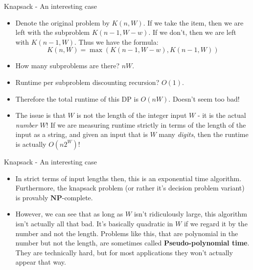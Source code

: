 \documentclass{beamer}
\begin{document}
\begin{frame}{Knapsack - An interesting case}
    \begin{itemize}
        \item Denote the original problem by $K(n,W)$. If we take the item, then we are left with the subproblem $K(n-1,W-w)$. If we don't, then we are left with $K(n-1,W)$. Thus we have the formula:
        \[ K(n,W) = \max\left(K(n-1,W-w), K(n-1,W)\right) \]
        \item How many subproblems are there? \pause $nW$. \pause 
        \item Runtime per subproblem discounting recursion? \pause $O(1)$. 
        \item Therefore the total runtime of this DP is $O(nW)$. Doesn't seem too bad! 
        \item The issue is that $W$ is not the length of the integer input $W$ - it is the actual \emph{number} $W$! If we are measuring runtime strictly in terms of the length of the input as a string, and given an input that is $W$ many \emph{digits}, then the runtime is actually $O(n2^W)$! 
    \end{itemize}
\end{frame}

\begin{frame}{Knapsack - An interesting case}
    \begin{itemize}
        \item In strict terms of input lengths then, this is an exponential time algorithm. Furthermore, the knapsack problem (or rather it's decision problem variant) is provably $\mathbf{NP}$-complete. \pause 
        \item However, we can see that as long as $W$ isn't ridiculously large, this algorithm isn't actually all that bad. It's basically quadratic in $W$ if we regard it by the number and not the length. Problems like this, that are polynomial in the number but not the length, are sometimes called \textbf{Pseudo-polynomial time}. They are technically hard, but for most applications they won't actually appear that way.  
    \end{itemize}
\end{frame}
\end{document}
